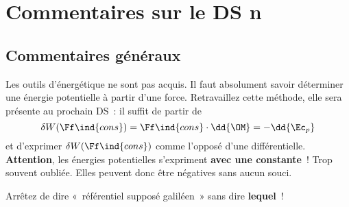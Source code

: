 \documentclass[a4paper, 12pt, final, garamond]{book}
\begin{document}
\setcounter{chapter}{5}

\chapter{Commentaires sur le DS n}

\section{Commentaires généraux}

Les outils d'énergétique ne sont pas acquis. Il faut absolument savoir
déterminer une énergie potentielle à partir d'une force. Retravaillez cette
méthode, elle sera présente au prochain DS~: il suffit de partir de
\[
	\delta W(\Ff\ind{cons}) = \Ff\ind{cons}\cdot \dd{\OM} = -\dd{\Ec_p}
\]
et d'exprimer $\delta W(\Ff\ind{cons})$ comme l'opposé d'une différentielle.
\smallbreak
\textbf{Attention}, les énergies potentielles s'expriment \textbf{avec une
	constante}~! Trop souvent oubliée. Elles peuvent donc être négatives sans
aucun souci.
\smallbreak
\begin{center}
	\large Arrêtez de dire «~référentiel supposé galiléen~» sans dire
	\textbf{lequel}~!
\end{center}

\end{document}
